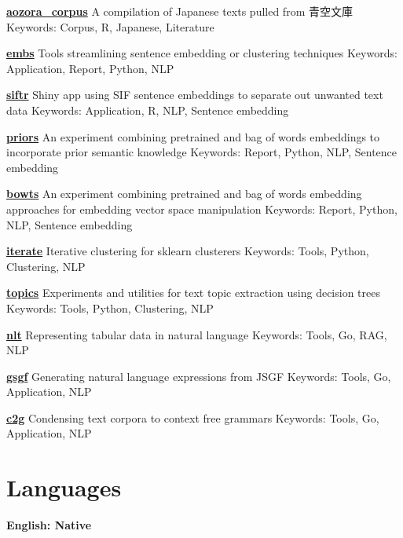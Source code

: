 \documentclass[a4paper,9pt]{extarticle}
\begin{document}
\noindent
\textbf{\href{https://github.com/ryancahildebrandt/aozora\_corpus}{aozora\_corpus}}
A compilation of Japanese texts pulled from 青空文庫
Keywords: Corpus, R, Japanese, Literature

\noindent
\textbf{\href{https://github.com/ryancahildebrandt/embs}{embs}}
Tools streamlining sentence embedding or clustering techniques
Keywords: Application, Report, Python, NLP

\noindent
\textbf{\href{https://github.com/ryancahildebrandt/siftr}{siftr}}
Shiny app using SIF sentence embeddings to separate out unwanted text data
Keywords: Application, R, NLP, Sentence embedding

\noindent
\textbf{\href{https://github.com/ryancahildebrandt/priors}{priors}}
An experiment combining pretrained and bag of words embeddings to incorporate prior semantic knowledge
Keywords: Report, Python, NLP, Sentence embedding

\noindent
\textbf{\href{https://github.com/ryancahildebrandt/bowts}{bowts}}
An experiment combining pretrained and bag of words embedding approaches for embedding vector space manipulation
Keywords: Report, Python, NLP, Sentence embedding

\noindent
\textbf{\href{https://github.com/ryancahildebrandt/iterate}{iterate}}
Iterative clustering for sklearn clusterers
Keywords: Tools, Python, Clustering, NLP

\noindent
\textbf{\href{https://github.com/ryancahildebrandt/topics}{topics}}
Experiments and utilities for text topic extraction using decision trees
Keywords: Tools, Python, Clustering, NLP

\noindent
\textbf{\href{https://github.com/ryancahildebrandt/nlt}{nlt}}
Representing tabular data in natural language
Keywords: Tools, Go, RAG, NLP

\noindent
\textbf{\href{https://github.com/ryancahildebrandt/gsgf}{gsgf}}
Generating natural language expressions from JSGF
Keywords: Tools, Go, Application, NLP

\noindent
\textbf{\href{https://github.com/ryancahildebrandt/c2g}{c2g}}
Condensing text corpora to context free grammars
Keywords: Tools, Go, Application, NLP



\section*{Languages}

\noindent
\textbf{English: Native}
\end{document}
